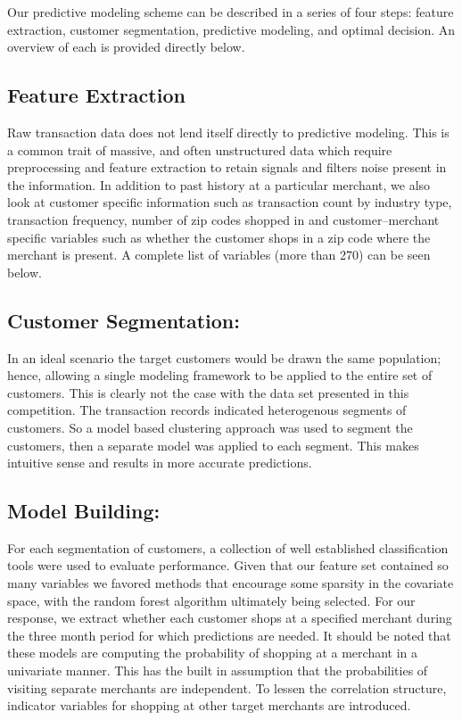 \documentclass[12pt]{article} %
\begin{document}
Our predictive modeling scheme can be described in a series of four steps: feature extraction, customer segmentation, predictive modeling, and optimal decision.  An overview of each is provided directly below.
\subsection*{Feature Extraction} 
Raw transaction data does not lend itself directly to predictive modeling.  This is a common trait of massive, and often unstructured data which require preprocessing and feature extraction to retain signals and filters noise present in the information.  In addition to past history at a particular merchant, we also look at customer specific information such as transaction count by industry type, transaction frequency, number of zip codes shopped in and customer--merchant specific variables such as whether the customer shops in a zip code where the merchant is present.  A complete list of variables (more than 270) can be seen below.  

\subsection*{Customer Segmentation:} 
In an ideal scenario the target customers would be drawn the same population; hence, allowing a single modeling framework to be applied to the entire set of customers.  This is clearly not the case with the data set presented in this competition.  The transaction records indicated  heterogenous segments of customers.  So a model based clustering approach was used to segment the customers, then a separate model was applied to each segment.  This makes intuitive sense and results in more accurate predictions. 

\subsection*{Model Building:} 
For each segmentation of customers, a collection of well established classification tools were used to evaluate performance.  Given that our feature set contained so many variables we favored methods that encourage some sparsity in the covariate space, with the random forest algorithm ultimately being selected.  For our response, we extract whether each customer shops at a specified merchant during the three month period for which predictions are needed.  It should be noted that these models are computing the probability of shopping at a merchant in a univariate manner.  This has the built in assumption that the probabilities of visiting separate merchants are independent.  To lessen the correlation structure, indicator variables for shopping at other target merchants are introduced.
\end{document}
